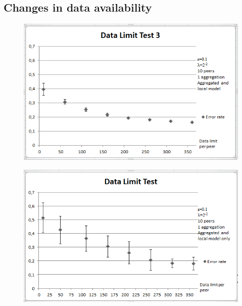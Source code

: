 \subsection{Changes in data availability}
\begin{figure}[H]
	\centering
	\begin{minipage}{.65\linewidth}
		\includegraphics[width=\linewidth]{fig/spambase/data_limit_test_localmodelonly}
		\label{fig:data_limit_test_localmodelonly}
	\end{minipage}
	\hspace{1mm}
	\begin{minipage}{.65\linewidth}
		\includegraphics[width=\linewidth]{fig/spambase/data_limit_test_withoutlocalmodel}
		\label{fig:data_limit_test_withoutlocalmodel}
	\end{minipage}
	\hspace{1mm}

\end{figure}

